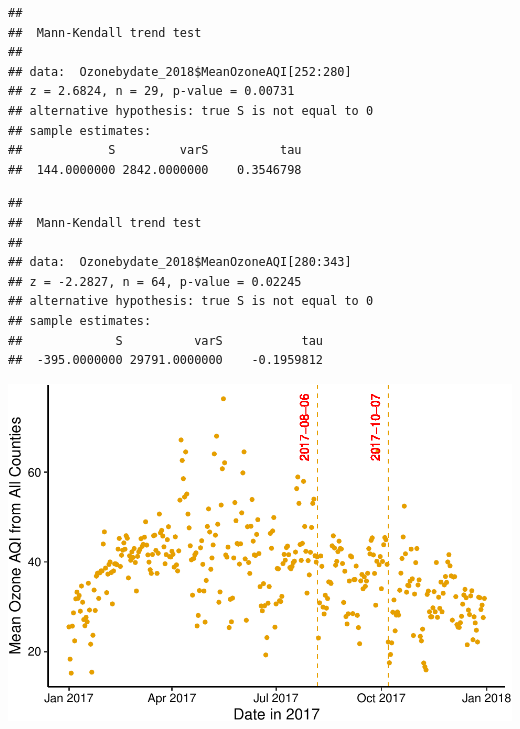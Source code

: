 \documentclass[12pt,]{article}
\newenvironment{Shaded}{\begin{snugshade}}{\end{snugshade}}
\newcommand{\KeywordTok}[1]{\textcolor[rgb]{0.13,0.29,0.53}{\textbf{#1}}}
\newcommand{\DecValTok}[1]{\textcolor[rgb]{0.00,0.00,0.81}{#1}}
\newcommand{\OperatorTok}[1]{\textcolor[rgb]{0.81,0.36,0.00}{\textbf{#1}}}
\newcommand{\NormalTok}[1]{#1}
\begin{document}
\begin{Shaded}
\end{Shaded}

\begin{verbatim}
## 
##  Mann-Kendall trend test
## 
## data:  Ozonebydate_2018$MeanOzoneAQI[252:280]
## z = 2.6824, n = 29, p-value = 0.00731
## alternative hypothesis: true S is not equal to 0
## sample estimates:
##            S         varS          tau 
##  144.0000000 2842.0000000    0.3546798
\end{verbatim}

\begin{Shaded}
\end{Shaded}

\begin{verbatim}
## 
##  Mann-Kendall trend test
## 
## data:  Ozonebydate_2018$MeanOzoneAQI[280:343]
## z = -2.2827, n = 64, p-value = 0.02245
## alternative hypothesis: true S is not equal to 0
## sample estimates:
##             S          varS           tau 
##  -395.0000000 29791.0000000    -0.1959812
\end{verbatim}

\pagebreak

\includegraphics{Xia_ENV_872_Project_files/figure-latex/Final visualization 2-1.pdf}
\pagebreak
\end{document}
